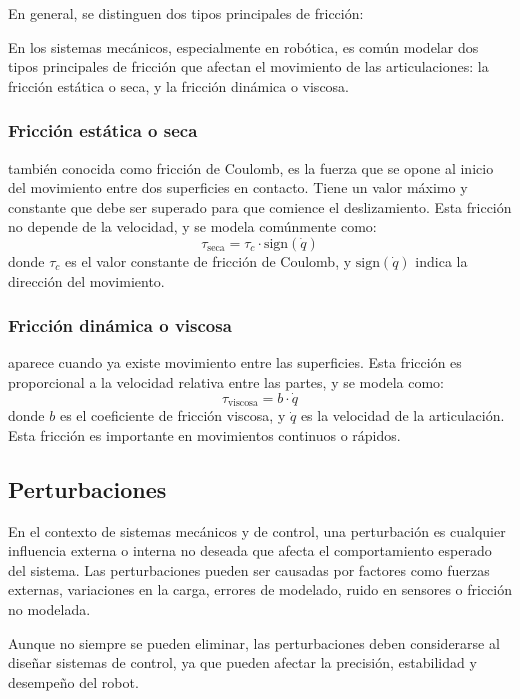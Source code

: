 En general, se distinguen dos tipos principales de fricción:


En los sistemas mecánicos, especialmente en robótica, es común modelar dos tipos principales de fricción que afectan el movimiento de las articulaciones: la fricción estática o seca, y la fricción dinámica o viscosa.


\subsubsection{Fricción estática o seca}

también conocida como fricción de Coulomb, es la fuerza que se opone al inicio del movimiento entre dos superficies en contacto. Tiene un valor máximo y constante que debe ser superado para que comience el deslizamiento. Esta fricción no depende de la velocidad, y se modela comúnmente como:
\[
\tau_{\text{seca}} = \tau_c \cdot \text{sign}(\dot{q})
\]
donde \( \tau_c \) es el valor constante de fricción de Coulomb, y \( \text{sign}(\dot{q}) \) indica la dirección del movimiento.

\subsubsection{Fricción dinámica o viscosa}


aparece cuando ya existe movimiento entre las superficies. Esta fricción es proporcional a la velocidad relativa entre las partes, y se modela como:
\[
\tau_{\text{viscosa}} = b \cdot \dot{q}
\]
donde \( b \) es el coeficiente de fricción viscosa, y \( \dot{q} \) es la velocidad de la articulación. Esta fricción es importante en movimientos continuos o rápidos.


\subsection{Perturbaciones}

En el contexto de sistemas mecánicos y de control, una perturbación es cualquier influencia externa o interna no deseada que afecta el comportamiento esperado del sistema. Las perturbaciones pueden ser causadas por factores como fuerzas externas, variaciones en la carga, errores de modelado, ruido en sensores o fricción no modelada.

Aunque no siempre se pueden eliminar, las perturbaciones deben considerarse al diseñar sistemas de control, ya que pueden afectar la precisión, estabilidad y desempeño del robot.
